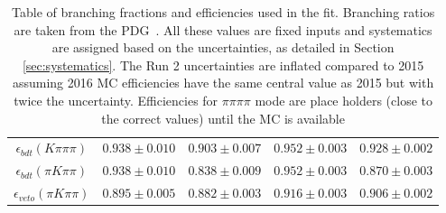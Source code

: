 \begin{table}
\begin{tabular}{c|cc|cc}
$\epsilon_{bdt}(K\pi\pi\pi)$ & $0.938 \pm 0.010$ & $0.903 \pm 0.007$ & $0.952 \pm 0.003$ & $0.928 \pm 0.002$ \\
$\epsilon_{bdt}(\pi K\pi\pi)$ & $0.938 \pm 0.010$ & $0.838 \pm 0.009$ & $0.952 \pm 0.003$ & $0.870 \pm 0.003$ \\
$\epsilon_{veto}(\pi K \pi\pi)$ & $0.895 \pm 0.005$ & $0.882 \pm 0.003$ & $0.916 \pm 0.003$ & $0.906 \pm 0.002$ \\
\hline
\end{tabular}
\caption{Table of branching fractions and efficiencies used in the \CP fit. Branching ratios are taken from the PDG~\cite{PDG2014}. All these values are fixed inputs and systematics are assigned based on the uncertainties, as detailed in Section \ref{sec:systematics}. The Run 2 uncertainties are inflated compared to 2015 assuming 2016 MC efficiencies have the same central value as 2015 but with twice the uncertainty. {\color{red} Efficiencies for $\pi\pi\pi\pi$ mode are place holders (close to the correct values) until the MC is available}}
\label{fitinputs}
\end{table}


\clearpage
